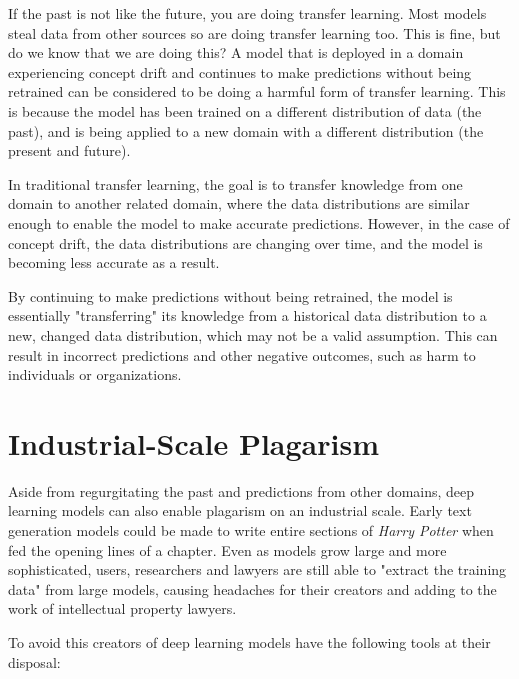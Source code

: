 If the past is not like the future, you are doing transfer learning. Most models steal data from other sources so are doing transfer learning too. This is fine, but do we know that we are doing this? A model that is deployed in a domain experiencing concept drift and continues to make predictions without being retrained can be considered to be doing a harmful form of transfer learning. This is because the model has been trained on a different distribution of data (the past), and is being applied to a new domain with a different distribution (the present and future).

In traditional transfer learning, the goal is to transfer knowledge from one domain to another related domain, where the data distributions are similar enough to enable the model to make accurate predictions. However, in the case of concept drift, the data distributions are changing over time, and the model is becoming less accurate as a result. 

By continuing to make predictions without being retrained, the model is essentially "transferring" its knowledge from a historical data distribution to a new, changed data distribution, which may not be a valid assumption. This can result in incorrect predictions and other negative outcomes, such as harm to individuals or organizations.

\section{Industrial-Scale Plagarism}

Aside from regurgitating the past and predictions from other domains, deep learning models can also enable plagarism on an industrial scale. Early text generation models could be made to write entire sections of \textit{Harry Potter} when fed the opening lines of a chapter. Even as models grow large and more sophisticated, users, researchers and lawyers are still able to "extract the training data"  from large models, causing headaches for their creators and adding to the work of intellectual property lawyers. 


To avoid this creators of deep learning models have the following tools at their disposal:

